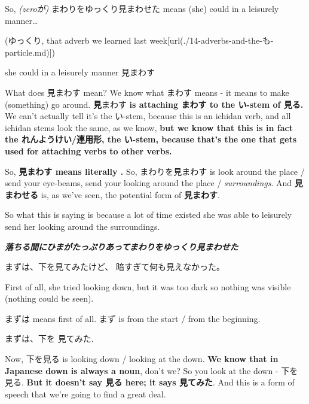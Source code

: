 {}

So, {\em (zeroが)} まわりをゆっくり見まわせた means (she) could in a leisurely manner\ldots{}

(ゆっくり, that adverb we learned last week\goto{{[}14{]}}[url(./14-adverbs-and-the-も-particle.md)])

she could in a leisurely manner 見まわす

What does 見まわす mean? We know what まわす means - it means to make (something) go around. {\bf 見}まわす {\bf is attaching まわす to the い-stem of 見る.} We can't actually tell it's the い-stem, because this is an ichidan verb, and all ichidan stems look the same, as we know, {\bf but we know that this is in fact the れんようけい/連用形, the い-stem, because that's the one that gets used for attaching verbs to other verbs.}

\thinrule

So, {\bf 見まわす means literally .} So, まわりを見まわす is look around the place / send your eye-beams, send your looking around the place / {\em surroundings}. And {\bf 見まわせる} is, as we've seen, the potential form of {\bf 見まわす}.

\thinrule

So what this is saying is because a lot of time existed she was able to leisurely send her looking around the surroundings.

{\bf {\em 落ちる間にひまがたっぷりあってまわりをゆっくり見まわせた}}

{}

\startblockquote
まずは、下を見てみたけど、 暗すぎて何も見えなかった。
\stopblockquote

First of all, she tried looking down, but it was too dark so nothing was visible (nothing could be seen).

まずは means first of all. まず is from the start / from the beginning.

{}

まずは、下を 見てみた.

Now, 下を見る is looking down / looking at the down. {\bf We know that in Japanese down is always a noun}, don't we? So you look at the down - 下を見る. {\bf But it doesn't say 見る here; it says 見てみた}. And this is a form of speech that we're going to find a great deal.

